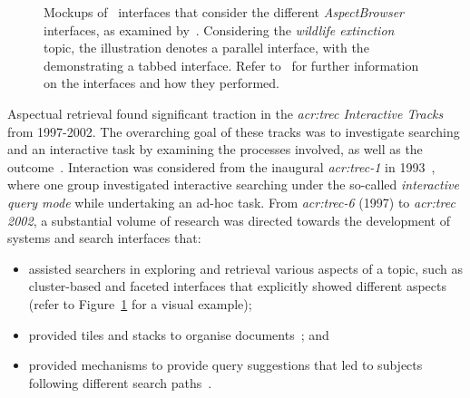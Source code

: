 \begin{figure}[t!]
    \centering
    \caption[Mockups of aspect-based retrieval system interfaces]{Mockups of \searchlogo~interfaces that consider the different \emph{AspectBrowser} interfaces, as examined by~\cite{villa2009aspect_interface}. Considering the \emph{wildlife extinction} topic, the  illustration denotes a parallel interface, with the  demonstrating a tabbed interface. Refer to~\cite{villa2009aspect_interface} for further information on the interfaces and how they performed.}
    \label{fig:tabbed_interface}
\end{figure}

Aspectual retrieval found significant traction in the \emph{\gls{acr:trec} Interactive Tracks}~\citep{over2001trec} from 1997-2002. The overarching goal of these tracks was to investigate searching and an interactive task by examining the processes involved, as well as the outcome~\citep{over2001trec}. Interaction was considered from the inaugural \emph{\gls{acr:trec}-1} in 1993~\citep{harman1993trec1}, where one group investigated interactive searching under the so-called \emph{interactive query mode} while undertaking an ad-hoc task. From \emph{\gls{acr:trec}-6} (1997) to \emph{\gls{acr:trec} 2002}, a substantial volume of research was directed towards the development of systems and search interfaces that:

\begin{itemize}
    \item{assisted searchers in exploring and retrieval various aspects of a topic, such as cluster-based and faceted interfaces that explicitly showed different aspects~\citep{mcdonald1998interactive, villa2009aspect_interface} (refer to Figure~\ref{fig:tabbed_interface} for a visual example);}
    \item{provided tiles and stacks to organise documents~\citep{hearst1995tilebars, hearst1997texttiling, harper2006piling, iwata2012tilediversified}; and}
    \item{provided mechanisms to provide query suggestions that led to subjects following different search paths~\citep{kato2012query_suggestion, umemoto2016scentbar}.}
\end{itemize}

